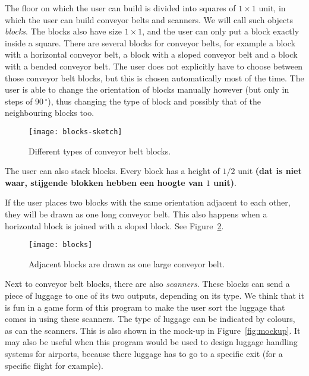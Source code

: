 The floor on which the user can build is divided into squares of $1 \times 1$ unit, in which the user can build conveyor belts and scanners. We will call such objects \textit{blocks}. The blocks also have size $1 \times 1$, and the user can only put a block exactly inside a square. There are several blocks for conveyor belts, for example a block with a horizontal conveyor belt, a block with a sloped conveyor belt and a block with a bended conveyor belt. The user does not explicitly have to choose between those conveyor belt blocks, but this is chosen automatically most of the time. The user is able to change the orientation of blocks manually however (but only in steps of $90\,^\circ$), thus changing the type of block and possibly that of the neighbouring blocks too.

\begin{figure}
  \begin{center}
    \texttt{[image: blocks-sketch]}
    \caption{Different types of conveyor belt blocks.}
    \label{fig:block-types}
  \end{center}
\end{figure}

The user can also stack blocks. Every block has a height of $1/2$ unit \textbf{(dat is niet waar, stijgende blokken hebben een hoogte van $1$ unit)}.

If the user places two blocks with the same orientation adjacent to each other, they will be drawn as one long conveyor belt. This also happens when a horizontal block is joined with a sloped block. See Figure~\ref{fig:blocks}.

\begin{figure}
  \begin{center}
    \texttt{[image: blocks]}
    \caption{Adjacent blocks are drawn as one large conveyor belt.}
    \label{fig:blocks}
  \end{center}
\end{figure}

Next to conveyor belt blocks, there are also \textit{scanners}. These blocks can send a piece of luggage to one of its two outputs, depending on its type. We think that it is fun in a game form of this program to make the user sort the luggage that comes in using these scanners. The type of luggage can be indicated by colours, as can the scanners. This is also shown in the mock-up in Figure~\ref{fig:mockup}. It may also be useful when this program would be used to design luggage handling systems for airports, because there luggage has to go to a specific exit (for a specific flight for example).